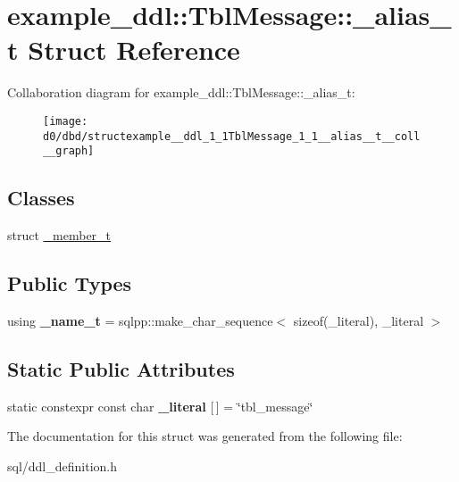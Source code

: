 \hypertarget{structexample__ddl_1_1TblMessage_1_1__alias__t}{}\section{example\+\_\+ddl\+:\+:Tbl\+Message\+:\+:\+\_\+alias\+\_\+t Struct Reference}
\label{structexample__ddl_1_1TblMessage_1_1__alias__t}


Collaboration diagram for example\+\_\+ddl\+:\+:Tbl\+Message\+:\+:\+\_\+alias\+\_\+t\+:
\nopagebreak
\begin{figure}[H]
\begin{center}
\leavevmode
\texttt{[image: d0/dbd/structexample\_\_ddl\_1\_1TblMessage\_1\_1\_\_alias\_\_t\_\_coll\_\_graph]}
\end{center}
\end{figure}
\subsection*{Classes}
\begin{DoxyCompactItemize}
\item 
struct \hyperlink{structexample__ddl_1_1TblMessage_1_1__alias__t_1_1__member__t}{\+\_\+member\+\_\+t}
\end{DoxyCompactItemize}
\subsection*{Public Types}
\begin{DoxyCompactItemize}
\item 
\hypertarget{structexample__ddl_1_1TblMessage_1_1__alias__t_a28899e293f345e14863a2fb7c710eba8}{}using {\bfseries \+\_\+name\+\_\+t} = sqlpp\+::make\+\_\+char\+\_\+sequence$<$ sizeof(\+\_\+literal), \+\_\+literal $>$\label{structexample__ddl_1_1TblMessage_1_1__alias__t_a28899e293f345e14863a2fb7c710eba8}

\end{DoxyCompactItemize}
\subsection*{Static Public Attributes}
\begin{DoxyCompactItemize}
\item 
\hypertarget{structexample__ddl_1_1TblMessage_1_1__alias__t_af4f057983b314c68f432551ef9687c5d}{}static constexpr const char {\bfseries \+\_\+literal} \mbox{[}$\,$\mbox{]} = \char`\"{}tbl\+\_\+message\char`\"{}\label{structexample__ddl_1_1TblMessage_1_1__alias__t_af4f057983b314c68f432551ef9687c5d}

\end{DoxyCompactItemize}


The documentation for this struct was generated from the following file\+:\begin{DoxyCompactItemize}
\item 
sql/ddl\+\_\+definition.\+h\end{DoxyCompactItemize}
